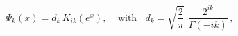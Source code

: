 \begin{equation}\label{d_k}
\Psi_k(x)=d_k \,K_{ik}\left(e^{x}\right),~~~~~\mbox{with}~~~~
d_k=\sqrt{\frac{2}{\pi}}\,\,\frac{2^{ik}}{\Gamma(-ik)}\,,
\end{equation}

